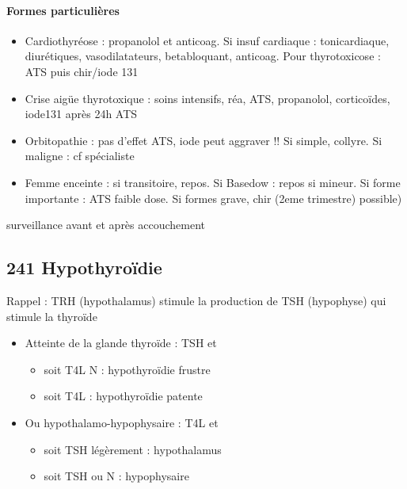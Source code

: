 \documentclass[11pt]{article}
\begin{document}
\paragraph{Formes particulières}
\label{sec:orga2fe8e4}
\begin{itemize}
\item Cardiothyréose : propanolol et anticoag. Si insuf cardiaque : tonicardiaque,
diurétiques, vasodilatateurs, betabloquant, anticoag. Pour thyrotoxicose : ATS
puis chir/iode 131
\item Crise aigüe thyrotoxique : soins intensifs, réa, ATS, propanolol, corticoïdes,
iode131 après 24h ATS
\item Orbitopathie : pas d'effet ATS, iode peut aggraver !! Si simple, collyre. Si maligne : cf spécialiste
\item Femme enceinte : si transitoire, repos. Si Basedow : repos si mineur. Si forme
importante : ATS faible dose. Si formes grave, chir (2eme trimestre) possible)
\end{itemize}
\thus surveillance avant et après accouchement  

\subsection{241 \textdagger{} Hypothyroïdie}
\label{sec:org0e3f94a}
\begin{tcolorbox}
Rappel : TRH (hypothalamus) stimule la production de TSH (hypophyse) qui stimule la thyroïde
\end{tcolorbox}

\begin{itemize}
\item Atteinte de la glande thyroïde  : \inc TSH et 
\begin{itemize}
\item soit T4L N : hypothyroïdie frustre
\item soit T4L \dec : hypothyroïdie patente
\end{itemize}
\item Ou hypothalamo-hypophysaire : T4L \dec et 
\begin{itemize}
\item soit TSH légèrement \inc : hypothalamus
\item soit TSH \dec ou N : hypophysaire
\end{itemize}
\end{itemize}
\end{document}
